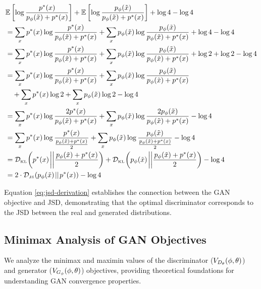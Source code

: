 \begin{small}
	\begin{align}
		 & \mathbb{E}\left[\log{{\ptx \over \pgx + \ptx}}\right] + \mathbb{E}\left[\log{\pgx\over\pgx + \ptx}\right] + \log4 - \log4 \nonumber \\
		 & = \sum_{x}\ptx\log{\ptx \over \pgx + \ptx} + \sum_{x}\pgx\log{\pgx \over \pgx + \ptx} + \log4 - \log4 \nonumber                     \\
		 & = \sum_{x}\ptx\log{\ptx \over \pgx + \ptx} + \sum_{x}\pgx\log{\pgx \over \pgx + \ptx} + \log2 + \log2 - \log4 \nonumber             \\
		 & = \sum_{x}\ptx\log{\ptx \over \pgx + \ptx} + \sum_{x}\pgx\log{\pgx
		\over \pgx + \ptx} \nonumber                                                                                                           \\
		 & \quad + \sum_{x}\ptx\log2 + \sum_{x}\pgx\log2 - \log4 \nonumber                                                                     \\
		 & = \sum_{x}\ptx\log{2\ptx \over \pgx + \ptx} + \sum_{x}\pgx\log{2\pgx \over \pgx + \ptx} - \log4 \nonumber                           \\
		 & = \sum_{x}\ptx\log{\ptx \over {\pgx + \ptx \over 2}} + \sum_{x}\pgx\log{\pgx \over {\pgx + \ptx \over 2}} - \log4 \nonumber         \\
		 & = \KL{\ptx}{\pgx + \ptx \over 2} + \KL{\pgx}{\pgx+\ptx \over 2} - \log4 \nonumber                                                   \\
		 & = 2 \cdot \JSD{\pgx}{\ptx} - \log4 \label{eq:jsd-derivation}
	\end{align}
\end{small}

Equation \ref{eq:jsd-derivation} establishes the connection between the GAN objective and JSD, demonstrating that the optimal discriminator corresponds to the JSD between the real and generated distributions.

\subsection{Minimax Analysis of GAN Objectives}
\label{sec:minimax-analysis}
We analyze the minimax and maximin values of the discriminator ($V_{D_\theta}(\phi, \theta)$) and generator ($V_{G_\phi}(\phi, \theta)$) objectives, providing theoretical foundations for understanding GAN convergence properties.

